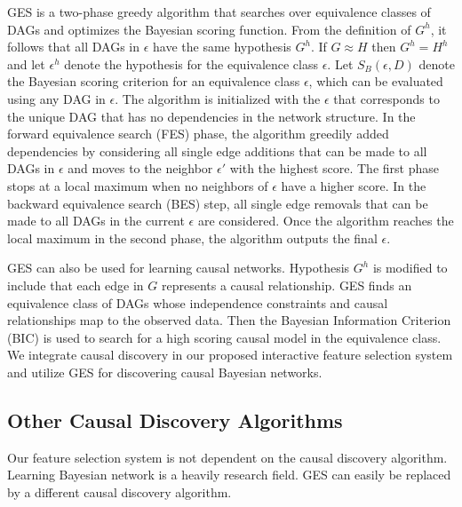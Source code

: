 GES is a two-phase greedy algorithm that searches over equivalence classes of DAGs and optimizes the Bayesian scoring function. From the definition of \(G^h\), it follows that all DAGs in $\epsilon$ have the same hypothesis \(G^h\). If \(G \approx H\) then \( G^h = H^h \) and let \(\epsilon^h\) denote the hypothesis for the equivalence class \(\epsilon\). Let \(S_B(\epsilon, D)\) denote the Bayesian scoring criterion for an equivalence class $\epsilon$, which can be evaluated using any DAG in \(\epsilon\). The algorithm is initialized with the \(\epsilon\) that corresponds to the unique DAG that has no dependencies in the network structure. In the forward equivalence search (FES) phase, the algorithm greedily added dependencies by considering all single edge additions that can be made to all DAGs in $\epsilon$ and moves to the neighbor \(\epsilon'\) with the highest score. The first phase stops at a local maximum when no neighbors of \(\epsilon\) have a higher score. In the backward equivalence search (BES) step, all single edge removals that can be made to all DAGs in the current $\epsilon$ are considered. Once the algorithm reaches the local maximum in the second phase, the algorithm outputs the final \(\epsilon\). 
 
GES can also be used for learning causal networks. Hypothesis \(G^h\) is modified to include that each edge in \(G\) represents a causal relationship. GES finds an equivalence class of DAGs whose independence constraints and causal relationships map to the observed data. Then the Bayesian Information Criterion (BIC) is used to search for a high scoring causal model in the equivalence class. We integrate causal discovery in our proposed interactive feature selection system and utilize GES for discovering causal Bayesian networks.

\subsection{Other Causal Discovery Algorithms}
Our feature selection system is not dependent on the causal discovery algorithm. Learning Bayesian network is a heavily research field. GES can easily be replaced by a different causal discovery algorithm. 


